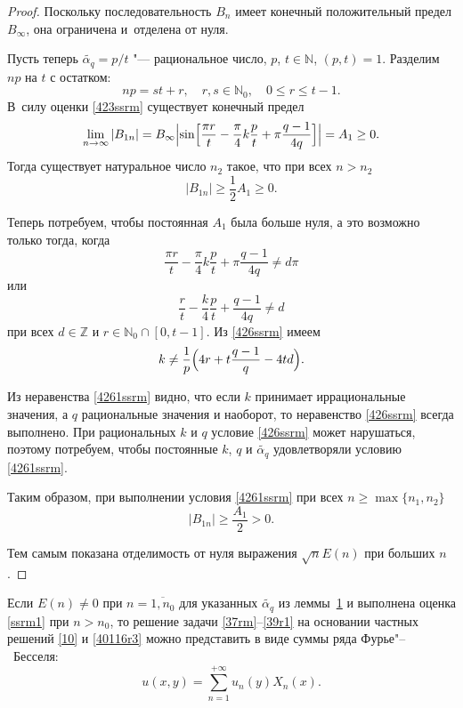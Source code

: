 \begin{proof}
Поскольку последовательность $B_{n}$ имеет конечный положительный предел $B_{\infty}$, она ограничена и~отделена от нуля.


Пусть теперь $\widetilde{\alpha_{q}}=p/t$ "--- рациональное число,
$p$, $t\in \mathbb{N}$, $(p, t)=1$. 
Разделим $np$ на $t$ с остатком: 
$$np=st+r,\quad r, s\in \mathbb{N}_{0},\quad  0\leq r\leq t-1.$$ 
В~силу оценки \eqref{423ssrm} существует конечный предел
\begin{equation*}
\lim\limits_{n\rightarrow
\infty}|B_{1n}|=B_{\infty}
\Bigl|\sin\Bigl[\frac{\pi
r}{t}-\frac{\pi}{4}k\frac{p}{t}+\pi\frac{q-1}{4q}\Bigr]\Bigr|=A_{1}\geq 0.
\end{equation*}
Тогда существует натуральное число $n_{2}$ такое, что при всех $n>n_{2}$
$$
|B_{1n}|\geq \frac{1}{2}A_{1}\geq 0.
$$

Теперь потребуем, чтобы постоянная $A_{1}$ была больше нуля, а это
возможно только тогда, когда
\begin{equation*}
\frac{\pi r}{t}-\frac{\pi}{4}k\frac{p}{t}+\pi\frac{q-1}{4q}\neq
d\pi
\end{equation*}
или
\begin{equation}\label{426ssrm}
\frac{r}{t}-\frac{k}{4}\frac{p}{t}+\frac{q-1}{4q}\neq d
\end{equation}
при всех $d\in \mathbb{Z}$ и $r\in \mathbb{N}_{0}\cap [0,t-1]$.
Из \eqref{426ssrm} имеем
\begin{equation}
\label{4261ssrm} k\neq
\frac{1}{p}\Bigl(4r+t\frac{q-1}{q}-4td\Bigr).
\end{equation}

Из неравенства \eqref{4261ssrm} видно, что если $k$ принимает иррациональные значения, а  $q$ рациональные значения и наоборот, то неравенство \eqref{426ssrm} всегда выполнено. 
При рациональных $k$ и $q$  условие \eqref{426ssrm} может нарушаться, поэтому потребуем, чтобы постоянные $k$, $q$ и $\widetilde{\alpha_{q}}$ удовлетворяли условию \eqref{4261ssrm}.

Таким образом, при выполнении условия \eqref{4261ssrm} при всех $n\geq \max\{n_{1},n_{2}\}$
\begin{equation*}
|B_{1n}|\geq \frac{A_{1}}{2}>0.
\end{equation*}

Тем самым показана отделимость от нуля выражения $\sqrt{n}E(n)$ при больших $n$.
\end{proof}

\smallskip

Если $E(n) \neq 0$ при $n=\overline{1, n_{0}}$ для указанных $\widetilde{\alpha_{q}}$ из леммы~\hyperlink{saf:lemma:1}{1} и выполнена оценка \eqref{ssrm1} при $n>n_{0}$, то решение задачи  \eqref{37rm}--\eqref{39r1} на основании частных решений \eqref{10} и \eqref{40116r3} можно представить в виде суммы ряда Фурье"--~Бесселя:
\begin{equation}
\label{431ssrm1} 
u(x,y)=\sum\limits_{n=1}^{+\infty}u_{n}(y)X_{n}(x).
\end{equation}

